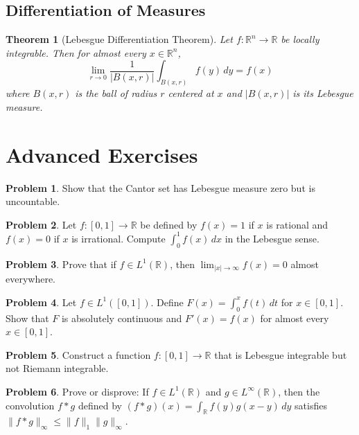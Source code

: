 \documentclass[12pt,a4paper]{article}
\theoremstyle{plain}
\newtheorem{theorem}{Theorem}[section]
\theoremstyle{definition}
\newtheorem{problem}{Problem}[section]
\begin{document}
\subsection{Differentiation of Measures}

\begin{theorem}[Lebesgue Differentiation Theorem]
Let $f: \mathbb{R}^n \to \mathbb{R}$ be locally integrable. Then for almost every $x \in \mathbb{R}^n$,
\begin{equation}
\lim_{r \to 0} \frac{1}{|B(x,r)|} \int_{B(x,r)} f(y) \, dy = f(x)
\end{equation}
where $B(x,r)$ is the ball of radius $r$ centered at $x$ and $|B(x,r)|$ is its Lebesgue measure.
\end{theorem}

\section{Advanced Exercises}

\begin{problem}
Show that the Cantor set has Lebesgue measure zero but is uncountable.
\end{problem}

\begin{problem}
Let $f: [0,1] \to \mathbb{R}$ be defined by $f(x) = 1$ if $x$ is rational and $f(x) = 0$ if $x$ is irrational. Compute $\int_0^1 f(x) \, dx$ in the Lebesgue sense.
\end{problem}

\begin{problem}
Prove that if $f \in L^1(\mathbb{R})$, then $\lim_{|x| \to \infty} f(x) = 0$ almost everywhere.
\end{problem}

\begin{problem}
Let $f \in L^1([0,1])$. Define $F(x) = \int_0^x f(t) \, dt$ for $x \in [0,1]$. Show that $F$ is absolutely continuous and $F'(x) = f(x)$ for almost every $x \in [0,1]$.
\end{problem}

\begin{problem}
Construct a function $f: [0,1] \to \mathbb{R}$ that is Lebesgue integrable but not Riemann integrable.
\end{problem}

\begin{problem}
Prove or disprove: If $f \in L^1(\mathbb{R})$ and $g \in L^\infty(\mathbb{R})$, then the convolution $f * g$ defined by $(f * g)(x) = \int_{\mathbb{R}} f(y)g(x-y) \, dy$ satisfies $\|f * g\|_\infty \leq \|f\|_1 \|g\|_\infty$.
\end{problem}
\end{document}
